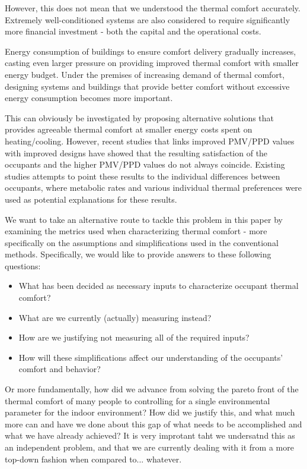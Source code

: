 However, this does not mean that we understood the thermal comfort accurately.
Extremely well-conditioned systems are also considered to require significantly more financial investment - both the capital and the operational costs.

Energy consumption of buildings to ensure comfort delivery gradually increases, casting even larger pressure on providing improved thermal comfort with smaller energy budget. Under the premises of increasing demand of thermal comfort, designing systems and buildings that provide better comfort without excessive energy consumption becomes more important.

This can obviously be investigated by proposing alternative solutions that provides agreeable thermal comfort at smaller energy costs spent on heating/cooling. However, recent studies that links improved PMV/PPD values with improved designs have showed that the resulting satisfaction of the occupants and the higher PMV/PPD values do not always coincide. Existing studies attempts to point these results to the individual differences between occupants, where metabolic rates and various individual thermal preferences were used as potential explanations for these results.

We want to take an alternative route to tackle this problem in this paper by examining the metrics used when characterizing thermal comfort - more specifically on the assumptions and simplifications used in the conventional methods. Specifically, we would like to provide answers to these following questions:

\begin{itemize}
\item What has been decided as necessary inputs to characterize occupant thermal comfort? 
\item What are we currently (actually) measuring instead?
\item How are we justifying not measuring all of the required inputs?
\item How will these simplifications affect our understanding of the occupants’ comfort and behavior?
\end{itemize}
Or more fundamentally, how did we advance from solving the pareto front of the thermal comfort of many people to controlling for a single environmental parameter for the indoor environment? How did we justify this, and what much more can and have we done about this gap of what needs to be accomplished and what we have already achieved? It is very improtant taht we undersatnd this as an independent problem, and that we are currently dealing with it from a more top-down fashion when compared to... whatever. 

